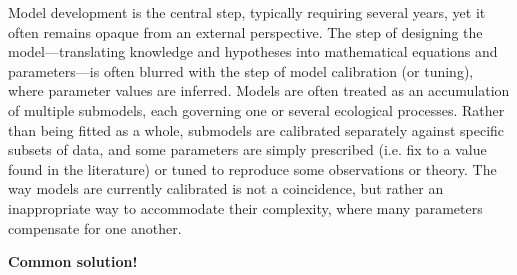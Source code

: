 \documentclass[11pt]{article}
\begin{document}
\begin{tcolorbox}
{\begin{multicols}{2}
\begin{minipage}[t]{\linewidth}
    \vspace{-0.5cm}\captionsetup{font=footnotesize}\label{fig:trends}
    \vspace*{1mm}
\end{minipage}

\noindent %
Model development is the central step, typically requiring several years, yet it often remains opaque from an external perspective. The step of designing the model---translating knowledge and hypotheses into mathematical equations and parameters---is often blurred with the step of model calibration (or tuning), where parameter values are inferred. Models are often treated as an accumulation of multiple submodels, each governing one or several ecological processes. Rather than being fitted as a whole, submodels are calibrated separately against specific subsets of data, and some parameters are simply prescribed (i.e. fix to a value found in the literature) or tuned to reproduce some observations or theory. The way models are currently calibrated is not a coincidence,
but rather an inappropriate way to accommodate their complexity, where many parameters compensate for one another.

\vfill

\end{multicols}}

\centerline{\bf Common solution!}
\vspace{0.2cm}
\noindent{}

\end{tcolorbox}
\end{document}
